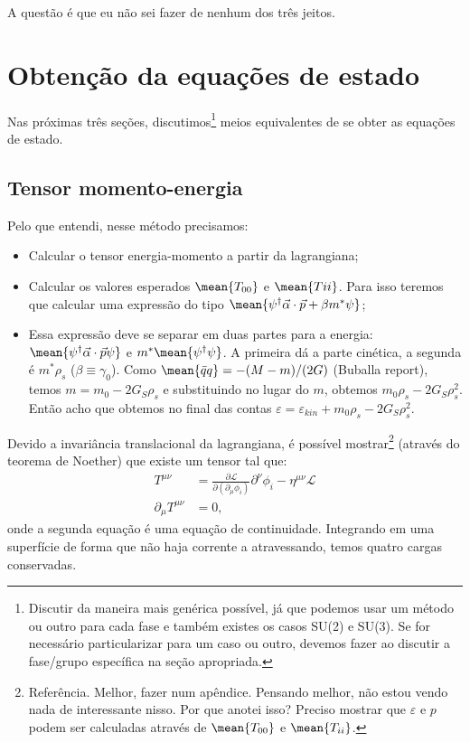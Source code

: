A questão é que eu não sei fazer de nenhum dos três jeitos.

\section{Obtenção da equações de estado}

Nas próximas três seções, discutimos\footnote{Discutir da maneira mais genérica possível, já que podemos usar um método ou outro para cada fase e também existes os casos SU(2) e SU(3). Se for necessário particularizar para um caso ou outro, devemos fazer ao discutir a fase/grupo específica na seção apropriada.} meios equivalentes de se obter as equações de estado. 

\subsection{Tensor momento-energia}

Pelo que entendi, nesse método precisamos:
\begin{itemize}
	\item Calcular o tensor energia-momento a partir da lagrangiana;
	\item Calcular os valores esperados $\mean{T_{00}}$ e $\mean{T{ii}}$. Para isso teremos que calcular uma expressão do tipo $\mean{\psi^\dagger \vec{\alpha}\cdot\vec{p} + \beta m^*\psi}$;
	\item Essa expressão deve se separar em duas partes para a energia: $\mean{\psi^\dagger\vec{\alpha}\cdot\vec{p}\psi}$ e $m^*\mean{\psi^\dagger\psi}$. A primeira dá a parte cinética, a segunda é $m^* \rho_s$ ($\beta \equiv \gamma_0$). Como $\mean{\bar{q}q} = -(M - m)/(2G)$ (Buballa report), temos $m = m_0 - 2G_S\rho_s$ e substituindo no lugar do $m$, obtemos $m_0\rho_s - 2G_S\rho_s^2$. Então acho que obtemos no final das contas $\varepsilon = \varepsilon_{kin} + m_0\rho_s - 2G_S\rho_s^2$.
\end{itemize}

Devido a invariância translacional da lagrangiana, é possível mostrar\footnote{Referência. Melhor, fazer num apêndice. Pensando melhor, não estou vendo nada de interessante nisso. Por que anotei isso? Preciso mostrar que $\varepsilon$ e $p$ podem ser calculadas através de $\mean{T_{00}}$ e $\mean{T_{ii}}$.} (através do teorema de Noether) que existe um tensor tal que:
\begin{align}
	T^{\mu\nu} &= \frac{\partial \mathcal{L}}{\partial(\partial_\mu \phi_i)}\partial^\nu\phi_i - \eta^{\mu\nu}\mathcal{L} \\
	\partial_\mu T^{\mu\nu} &= 0,
\end{align}
%
onde a segunda equação é uma equação de continuidade. Integrando em uma superfície de forma que não haja corrente a atravessando, temos quatro cargas conservadas.

